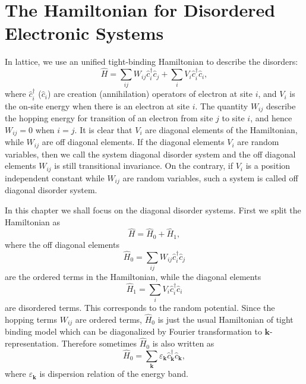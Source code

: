 \documentclass{book}
\numberwithin{equation}{section}
\begin{document}
\section{The Hamiltonian for Disordered Electronic Systems}
In lattice, we use an unified tight-binding Hamiltonian to describe
the disorders:
\begin{equation}
  \label{eq:disordered-hamiltonian}
  \hat{H}=\sum_{ij}W_{ij}\hat{c}^\dag_i\hat{c}_j
  +\sum_{i}V_i\hat{c}^\dagger_i\hat{c}_i,
\end{equation}
where $\hat{c}_i^\dagger$ ($\hat{c}_i$) are creation (annihilation)
operators of electron at site $i$, and $V_i$ is the on-site energy
when there is an electron at site $i$. The quantity $W_{ij}$ describe
the hopping energy for transition of an electron from site $j$ to site
$i$, and hence $W_{ij}=0$ when $i=j$. It is clear that $V_i$ are
diagonal elements of the Hamiltonian, while $W_{ij}$ are off diagonal
elements. If the diagonal elements $V_i$ are random variables, then we
call the system diagonal disorder system and the off diagonal elements
$W_{ij}$ is still transitional invariance. On the contrary, if $V_i$
is a position independent constant while $W_{ij}$ are random
variables, such a system is called off diagonal disorder system.

In this chapter we shall focus on the diagonal disorder systems. First
we split the Hamiltonian as
\begin{equation}
  \hat{H}=\hat{H}_0+\hat{H}_1,
\end{equation}
where the off diagonal elements
\begin{equation}
  \hat{H}_0=\sum_{ij}W_{ij}\hat{c}^\dagger_i\hat{c}_j
\end{equation}
are the ordered terms in the Hamiltonian, while the diagonal elements
\begin{equation}
  \hat{H}_1=\sum_{i}V_{i}\hat{c}_i^\dagger\hat{c}_i
\end{equation}
are disordered terms. This corresponds to the random potential. Since
the hopping terms $W_{ij}$ are ordered terms, $\hat{H}_0$ is just the
usual Hamiltonian of tight binding model which can be diagonalized by
Fourier transformation to $\bm{k}$-representation. Therefore sometimes
$\hat{H}_0$ is also written as
\begin{equation}
  \hat{H}_0=\sum_{\bm{k}}\varepsilon_{\bm{k}}\hat{c}^\dagger_{\bm{k}}\hat{c}_{\bm{k}},
\end{equation}
where $\varepsilon_{\bm{k}}$ is dispersion relation of the energy
band. 
\end{document}
